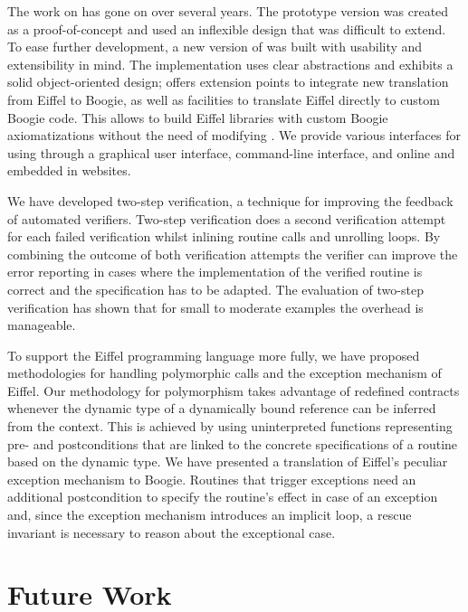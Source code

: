 The work on \AutoProof has gone on over several years.
The prototype version was created as a proof-of-concept and used an inflexible design that was difficult to extend.
To ease further development, a new version of \AutoProof was built with usability and extensibility in mind.
The implementation uses clear abstractions and exhibits a solid object-oriented design; \AutoProof offers extension points to integrate new translation from Eiffel to Boogie, as well as facilities to translate Eiffel directly to custom Boogie code.
This allows to build Eiffel libraries with custom Boogie axiomatizations without the need of modifying \AutoProof.
We provide various interfaces for using \AutoProof through a graphical user interface, command-line interface, and online and embedded in websites.

We have developed two-step verification, a technique for improving the feedback of automated verifiers. Two-step verification does a second verification attempt for each failed verification whilst inlining routine calls and unrolling loops. By combining the outcome of both verification attempts the verifier can improve the error reporting in cases where the implementation of the verified routine is correct and the specification has to be adapted. The evaluation of two-step verification has shown that for small to moderate examples the overhead is manageable.

To support the Eiffel programming language more fully, we have proposed methodologies for handling polymorphic calls and the exception mechanism of Eiffel. Our methodology for polymorphism takes advantage of redefined contracts whenever the dynamic type of a dynamically bound reference can be inferred from the context. This is achieved by using uninterpreted functions representing pre- and postconditions that are linked to the concrete specifications of a routine based on the dynamic type. We have presented a translation of Eiffel's peculiar exception mechanism to Boogie. Routines that trigger exceptions need an additional postcondition to specify the routine's effect in case of an exception and, since the exception mechanism introduces an implicit loop, a rescue invariant is necessary to reason about the exceptional case.



\section{Future Work}
\label{sec:futurework}


